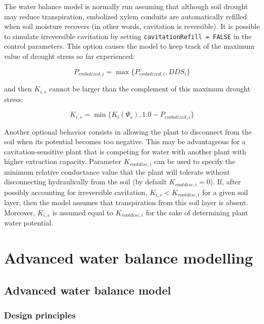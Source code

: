 \documentclass[]{book}
\begin{document}
The water balance model is normally run assuming that although soil
drought may reduce transpiration, embolized xylem conduits are
automatically refilled when soil moisture recovers (in other words,
cavitation is reversible). It is possible to simulate irreversible
cavitation by setting \texttt{cavitationRefill\ =\ FALSE} in the control
parameters. This option causes the model to keep track of the maximum
value of drought stress so far experienced:

\begin{equation}
P_{embolized,i}= \max \{P_{embolized,i}, DDS_i \}
\end{equation}

and then \(K_{i,s}\) cannot be larger than the complement of this
maximum drought stress:

\begin{equation}
K_{i,s} = \min \{K_{i}(\Psi_s), 1.0 - P_{embolized,i} \}
\end{equation}

Another optional behavior consists in allowing the plant to disconnect
from the soil when its potential becomes too negative. This may be
advantageous for a cavitation-sensitive plant that is competing for
water with another plant with higher extraction capacity. Parameter
\(K_{rootdisc,i}\) can be used to specify the minimum relative
conductance value that the plant will tolerate without disconnecting
hydraulically from the soil (by default \(K_{rootdisc,i} = 0\)). If,
after possibly accounting for irreversible cavitation,
\(K_{i,s}<K_{rootdisc,i}\) for a given soil layer, then the model
assumes that transpiration from this soil layer is absent. Moreover,
\(K_{i,s}\) is assumed equal to \(K_{rootdisc,i}\) for the sake of
determining plant water potential.

\part{Advanced water balance
modelling}\label{part-advanced-water-balance-modelling}

\chapter{Advanced water balance
model}\label{advanced-water-balance-model}

\section{Design principles}\label{design-principles-1}
\end{document}

